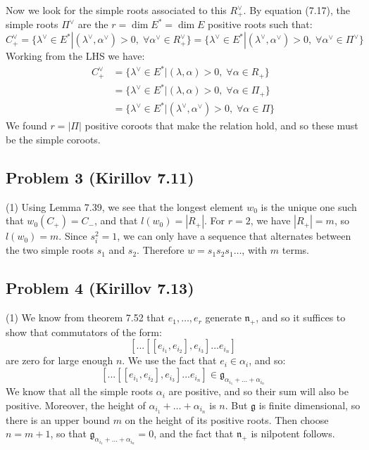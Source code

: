 \documentclass[12 pt]{article}
\newcommand{\fr}{\mathfrak}
\begin{document}
Now we look for the simple roots associated to this $R^{\vee}_+$. By equation (7.17), the simple roots $\Pi^{\vee}$ are the $r = \dim E^* = \dim E$ positive roots such that:
\[       C_+^{\vee} =    \{ \lambda^{\vee} \in E^*  | (\lambda^{\vee}, \alpha^{\vee}) > 0,\; \forall \alpha^{\vee} \in R^{\vee}_+ \} =  \{ \lambda^{\vee} \in E^*  | (\lambda^{\vee}, \alpha^{\vee}) > 0,\; \forall \alpha^{\vee} \in \Pi^{\vee} \}    \]
Working from the LHS we have:
\begin{align*}
C_+^{\vee} &=  \{ \lambda^{\vee} \in E^*  | (\lambda, \alpha) > 0,\; \forall \alpha \in R_+ \} \\
&=  \{ \lambda^{\vee} \in E^*  | (\lambda, \alpha) > 0,\; \forall \alpha \in \Pi_+ \} \\
&= \{ \lambda^{\vee} \in E^*  | (\lambda^{\vee}, \alpha^{\vee}) > 0,\; \forall \alpha \in \Pi \}
\end{align*}
We found $r = | \Pi |$ positive coroots that make the relation hold, and so these must be the simple coroots.

\subsection*{Problem 3 (Kirillov 7.11)}
(1) Using Lemma 7.39, we see that the longest element $w_0$ is the unique one such that $w_0(C_+) = C_-$, and that $l(w_0) = |R_+|$. For $r=2$, we have $|R_+| = m$, so $l(w_0) = m$. Since $s_{i}^2 = 1$, we can only have a sequence that alternates between the two simple roots $s_1$ and $s_2$. Therefore $w = s_1 s_2 s_1 \dots$, with $m$ terms.



\subsection*{Problem 4 (Kirillov 7.13)}
(1) We know from theorem 7.52 that $e_1, \dots, e_r$ generate $\fr{n}_+$, and so it suffices to show that commutators of the form:
\[             [ ... [[e_{i_1}, e_{i_2}], e_{i_3}] ... e_{i_n}]          \]
are zero for large enough $n$. We use the fact that $e_{i} \in \alpha_{i}$, and so:
\[             [ ... [[e_{i_1}, e_{i_2}], e_{i_3}] ... e_{i_n}]   \in \fr g_{\alpha_{i_1} + \dots + \alpha_{i_n}}           \]
We know that all the simple roots $\alpha_i$ are positive, and so their sum will also be positive. Moreover, the height of $\alpha_{i_1} + \dots + \alpha_{i_n}$ is $n$. But $\fr g$ is finite dimensional, so there is an upper bound $m$ on the height of its positive roots. Then choose $n = m+1$, so that $\fr g_{\alpha_{i_1} + \dots + \alpha_{i_n}}  = 0$, and the fact that $\fr n_{+}$ is nilpotent follows.
\end{document}
